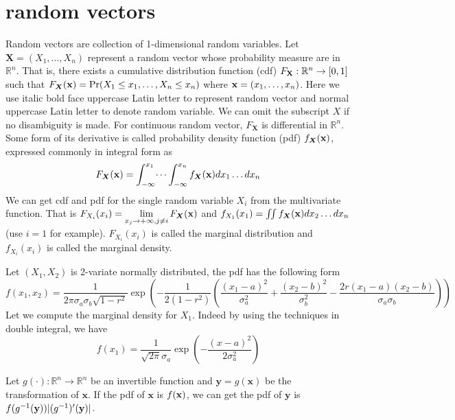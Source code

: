\section{random vectors}
Random vectors are collection of 1-dimensional random variables. Let $\bm{X} = (X_1, \dots, X_n)$ 
represent a random vector whose probability measure are in $\mathbb{R}^n$.
That is, there exists a cumulative distribution function (cdf) $F_{\mathbf{X}}: \mathbb{R}^n \rightarrow [0,1]$ 
such that $F_{\bm{X}}(\mathbf{x}) = \Pr(X_1 \leq x_1, \dots, X_n \leq x_n)$ where $ \mathbf{x} = (x_1, \dots, x_n)$.
Here we use italic bold face uppercase Latin letter to represent random vector and normal uppercase Latin letter to denote random variable. We can omit the subscript $X$ if no disambiguity is made. For continuous random vector, $F_{\bm{X}}$ is differential in $\mathbb{R}^n$. Some form of its derivative is called probability density function (pdf) $f_{\bm{X}}(\mathbf{x})$, expressed commonly in integral form as
\begin{equation}
F_{\bm{X}}(\mathbf{x}) = \int_{-\infty}^{x_1}\dots\int_{-\infty}^{x_n} f_{\bm{X}}(\mathbf{x}) dx_1 \dots dx_n
\end{equation}
We can get cdf and pdf for the single random variable $X_i$ from the multivariate function. That is
$ F_{X_i}(x_i) = \displaystyle\lim_{x_j \to +\infty, j\neq i} F_{\bm{X}}(\mathbf{x})$ and 
$ f_{X_1}(x_1) = \iint f_{\bm{X}}(\mathbf{x})dx_2 \dots d x_n$ (use $i=1$ for example).
$F_{X_i}(x_i)$ is called the marginal distribution and $f_{X_i}(x_i)$ is called the marginal density.

\begin{example}\label{ex:g2}
	Let $(X_1, X_2)$ is 2-variate normally distributed,  the pdf has the following form
\begin{equation}
f(x_1, x_2) = \frac{1}{2\pi \sigma_a \sigma_b \sqrt{1-r^2}} \exp(-\frac{1}{2(1-r^2)} \left(\frac{(x_1-a)^2}{\sigma_a^2} + \frac{(x_2-b)^2}{\sigma_b^2} -\frac{2r(x_1-a)(x_2-b)}{\sigma_a \sigma_b}\right)) 
\end{equation}
Let we compute the marginal density for $X_1$. Indeed by using the techniques in double integral, we have
\begin{equation}
f(x_1) = \frac{1}{\sqrt{2\pi}\sigma_a} \exp(-\frac{(x-a)^2}{2\sigma_a^2})
\end{equation}

\end{example}
Let $g(\cdot): \mathbb{R}^n \to \mathbb{R}^n$ be an invertible function and $\bm{y} = g(\bm{x})$ be the transformation of $\bm{x}$.
If the pdf of $\bm{x}$ is $f(\mathbf{x})$, we can get the pdf of $\bm{y}$ is $f(g^{-1}(\mathbf{y})) \lvert(g^{-1})'(\mathbf{y})\rvert$.

